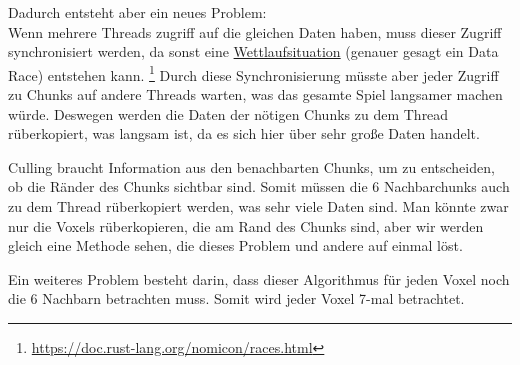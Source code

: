 \vspace{0.3cm}



\vspace{0.3cm}

Dadurch entsteht aber ein neues Problem: \\
Wenn mehrere Threads zugriff auf die gleichen Daten
haben, muss dieser Zugriff synchronisiert werden,
da sonst eine
\href{https://de.wikipedia.org/wiki/Wettlaufsituation}{Wettlaufsituation}
(genauer gesagt ein Data Race) entstehen kann.
\footnote{\url{https://doc.rust-lang.org/nomicon/races.html}}
Durch diese Synchronisierung müsste aber jeder Zugriff
zu Chunks auf andere Threads warten, was das gesamte
Spiel langsamer machen würde. Deswegen werden die
Daten der nötigen Chunks zu dem Thread rüberkopiert,
was langsam ist, da es sich hier über sehr große Daten
handelt.

Culling braucht Information aus den benachbarten
Chunks, um zu entscheiden, ob die Ränder des Chunks
sichtbar sind. Somit müssen die 6 Nachbarchunks
auch zu dem Thread rüberkopiert werden, was sehr viele
Daten sind. Man könnte zwar nur die Voxels
rüberkopieren, die am Rand des Chunks sind,
aber wir werden gleich eine Methode sehen,
die dieses Problem und andere auf einmal löst.

\vspace{0.3cm}

Ein weiteres Problem besteht darin, dass dieser
Algorithmus für jeden Voxel noch die 6 Nachbarn
betrachten muss. Somit wird jeder Voxel 7-mal
betrachtet.
